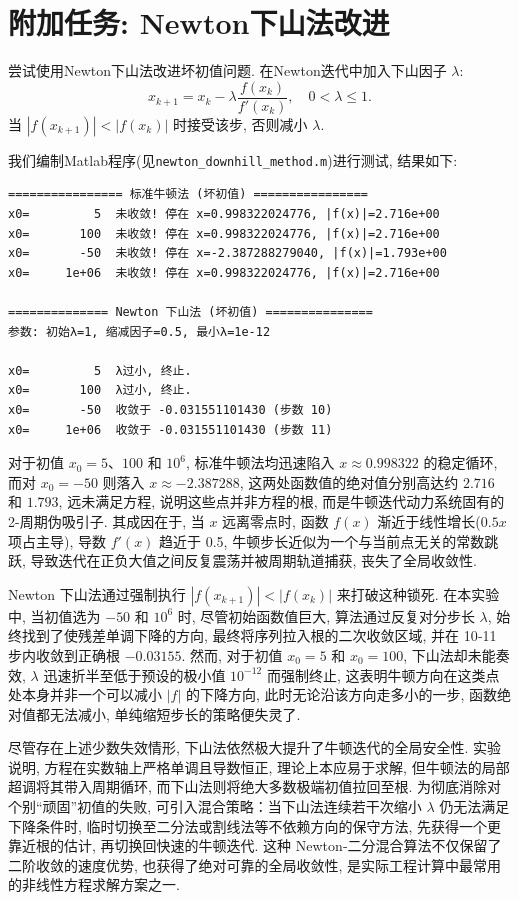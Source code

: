 \documentclass[zihao=-4,a4paper]{ctexart}
\begin{document}
\section{附加任务: Newton下山法改进}
尝试使用Newton下山法改进坏初值问题. 在Newton迭代中加入下山因子 $\lambda$: 
\[
x_{k+1} = x_k - \lambda \frac{f(x_k)}{f'(x_k)},\quad 0<\lambda\le 1.
\]
当 $|f(x_{k+1})| < |f(x_k)|$ 时接受该步, 否则减小 $\lambda$. 

我们编制Matlab程序(见\texttt{newton\_downhill\_method.m})进行测试, 结果如下:
\begin{lstlisting}
================ 标准牛顿法 (坏初值) ================
x0=         5  未收敛! 停在 x=0.998322024776, |f(x)|=2.716e+00
x0=       100  未收敛! 停在 x=0.998322024776, |f(x)|=2.716e+00
x0=       -50  未收敛! 停在 x=-2.387288279040, |f(x)|=1.793e+00
x0=     1e+06  未收敛! 停在 x=0.998322024776, |f(x)|=2.716e+00

============== Newton 下山法 (坏初值) ===============
参数: 初始λ=1, 缩减因子=0.5, 最小λ=1e-12

x0=         5  λ过小, 终止.
x0=       100  λ过小, 终止.
x0=       -50  收敛于 -0.031551101430 (步数 10)
x0=     1e+06  收敛于 -0.031551101430 (步数 11)
\end{lstlisting}

对于初值 $x_0=5$、$100$ 和 $10^6$, 标准牛顿法均迅速陷入 $x\approx 0.998322$ 的稳定循环, 而对 $x_0=-50$ 则落入 $x\approx -2.387288$, 这两处函数值的绝对值分别高达约 $2.716$ 和 $1.793$, 远未满足方程, 说明这些点并非方程的根, 而是牛顿迭代动力系统固有的 2-周期伪吸引子. 其成因在于, 当 $x$ 远离零点时, 函数 $f(x)$ 渐近于线性增长($0.5x$ 项占主导), 导数 $f'(x)$ 趋近于 0.5, 牛顿步长近似为一个与当前点无关的常数跳跃, 导致迭代在正负大值之间反复震荡并被周期轨道捕获, 丧失了全局收敛性. 

Newton 下山法通过强制执行 $|f(x_{k+1})|<|f(x_k)|$ 来打破这种锁死. 在本实验中, 当初值选为 $-50$ 和 $10^6$ 时, 尽管初始函数值巨大, 算法通过反复对分步长 $\lambda$, 始终找到了使残差单调下降的方向, 最终将序列拉入根的二次收敛区域, 并在 10‑11 步内收敛到正确根 $-0.03155$. 然而, 对于初值 $x_0=5$ 和 $x_0=100$, 下山法却未能奏效, $\lambda$ 迅速折半至低于预设的极小值 $10^{-12}$ 而强制终止, 这表明牛顿方向在这类点处本身并非一个可以减小 $|f|$ 的下降方向, 此时无论沿该方向走多小的一步, 函数绝对值都无法减小, 单纯缩短步长的策略便失灵了. 

尽管存在上述少数失效情形, 下山法依然极大提升了牛顿迭代的全局安全性. 实验说明, 方程在实数轴上严格单调且导数恒正, 理论上本应易于求解, 但牛顿法的局部超调将其带入周期循环, 而下山法则将绝大多数极端初值拉回至根. 为彻底消除对个别“顽固”初值的失败, 可引入混合策略：当下山法连续若干次缩小 $\lambda$ 仍无法满足下降条件时, 临时切换至二分法或割线法等不依赖方向的保守方法, 先获得一个更靠近根的估计, 再切换回快速的牛顿迭代. 这种 Newton‑二分混合算法不仅保留了二阶收敛的速度优势, 也获得了绝对可靠的全局收敛性, 是实际工程计算中最常用的非线性方程求解方案之一. 
\end{document}
